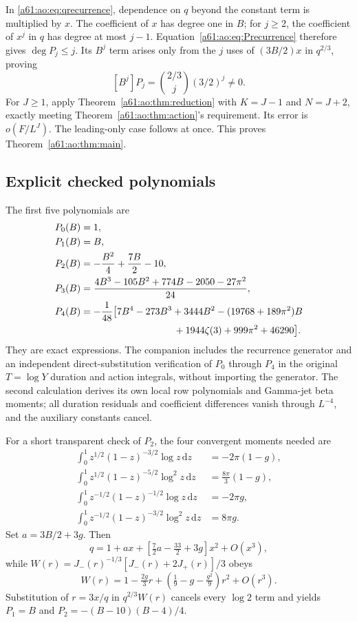 \documentclass[11pt,letterpaper]{article}
\numberwithin{equation}{section}
\theoremstyle{remark}\newtheorem{remark}[theorem]{Remark}
\newcommand{\dd}{\,\mathrm d}
\begin{document}
In \eqref{a61:ao:eq:qrecurrence}, dependence on $q$ beyond the constant term
is multiplied by $x$. The coefficient of $x$ has degree one in $B$;
for $j\ge2$, the coefficient of $x^j$ in $q$ has degree at most
$j-1$. Equation~\eqref{a61:ao:eq:Precurrence} therefore gives
$\deg P_j\le j$. Its $B^j$ term arises only from the $j$ uses of
$(3B/2)x$ in $q^{2/3}$, proving
\[
 [B^j]P_j=\binom{2/3}{j}(3/2)^j\ne0.
\]
For $J\ge1$, apply Theorem~\ref{a61:ao:thm:reduction} with $K=J-1$ and
$N=J+2$, exactly meeting Theorem~\ref{a61:ao:thm:action}'s requirement. Its
error is $o(F/L^J)$. The leading-only case follows at once. This
proves Theorem~\ref{a61:ao:thm:main}.

\subsection{Explicit checked polynomials}
The first five polynomials are
\begin{align*}
 P_0(B)&=1,\\
 P_1(B)&=B,\\
 P_2(B)&=-\frac{B^2}{4}+\frac{7B}{2}-10,\\
 P_3(B)&=\frac{4B^3-105B^2+774B-2050-27\pi^2}{24},\\
 P_4(B)&=-\frac1{48}\bigl[7B^4-273B^3+3444B^2
 -(19768+189\pi^2)B\\
 &\hspace{34mm}+1944\zeta(3)+999\pi^2+46290\bigr].
\end{align*}
They are exact expressions. The companion includes the recurrence
generator and an independent direct-substitution verification of
$P_0$ through $P_4$ in the original $T=\log Y$ duration and action
integrals, without importing the generator. The second calculation
derives its own local row polynomials and Gamma-jet beta moments;
all duration residuals and coefficient differences vanish through
$L^{-4}$, and the auxiliary constants cancel.

For a short transparent check of $P_2$, the four convergent moments
needed are
\begin{align*}
 \int_0^1z^{1/2}(1-z)^{-3/2}\log z\dd z&=-2\pi(1-g),\\
 \int_0^1z^{1/2}(1-z)^{-5/2}\log^2z\dd z&=\tfrac{8\pi}3(1-g),\\
 \int_0^1z^{-1/2}(1-z)^{-1/2}\log z\dd z&=-2\pi g,\\
 \int_0^1z^{-1/2}(1-z)^{-3/2}\log^2z\dd z&=8\pi g.
\end{align*}
Set $a=3B/2+3g$. Then
\[
 q=1+ax+\left[\tfrac72a-\tfrac{33}2+3g\right]x^2+O(x^3),
\]
while $W(r)=J_-(r)^{-1/3}[J_-(r)+2J_+(r)]/3$ obeys
\[
 W(r)=1-\tfrac{2g}3r+\left(\tfrac19-g-\tfrac{g^2}9\right)r^2
 +O(r^3).
\]
Substitution of $r=3x/q$ in $q^{2/3}W(r)$ cancels every $\log2$ term
and yields $P_1=B$ and $P_2=-(B-10)(B-4)/4$.
\end{document}
